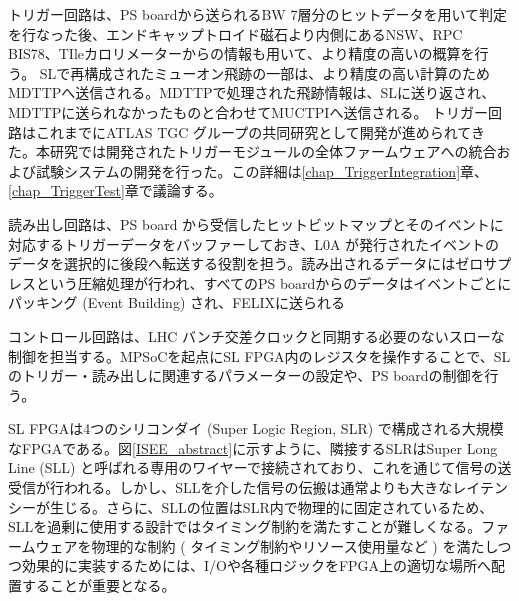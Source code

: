 トリガー回路は、PS boardから送られるBW 7層分のヒットデータを用いて\pt 判定を行なった後、エンドキャップトロイド磁石より内側にあるNSW、RPC BIS78、TIleカロリメーターからの情報も用いて、より精度の高い\pt の概算を行う。
SLで再構成されたミューオン飛跡の一部は、より精度の高い\pt 計算のためMDTTPへ送信される。MDTTPで処理された飛跡情報は、SLに送り返され、MDTTPに送られなかったものと合わせてMUCTPIへ送信される。
トリガー回路はこれまでにATLAS TGC グループの共同研究として開発が進められてきた。本研究では開発されたトリガーモジュールの全体ファームウェアへの統合および試験システムの開発を行った。この詳細は\ref{chap_TriggerIntegration}章、\ref{chap_TriggerTest}章で議論する。

読み出し回路は、PS board から受信したヒットビットマップとそのイベントに対応するトリガーデータをバッファーしておき、L0A が発行されたイベントのデータを選択的に後段へ転送する役割を担う。読み出されるデータにはゼロサプレスという圧縮処理が行われ、すべてのPS boardからのデータはイベントごとにパッキング  (Event Building) され、FELIXに送られる

コントロール回路は、LHC バンチ交差クロックと同期する必要のないスローな制御を担当する。MPSoCを起点にSL FPGA内のレジスタを操作することで、SLのトリガー・読み出しに関連するパラメーターの設定や、PS boardの制御を行う。

SL FPGAは4つのシリコンダイ (Super Logic Region, SLR) で構成される大規模なFPGAである。図\ref{ISEE_abstract}に示すように、隣接するSLRはSuper Long Line (SLL) と呼ばれる専用のワイヤーで接続されており、これを通じて信号の送受信が行われる。しかし、SLLを介した信号の伝搬は通常よりも大きなレイテンシーが生じる。さらに、SLLの位置はSLR内で物理的に固定されているため、SLLを過剰に使用する設計ではタイミング制約を満たすことが難しくなる。ファームウェアを物理的な制約 ( タイミング制約やリソース使用量など ) を満たしつつ効果的に実装するためには、I/Oや各種ロジックをFPGA上の適切な場所へ配置することが重要となる。

